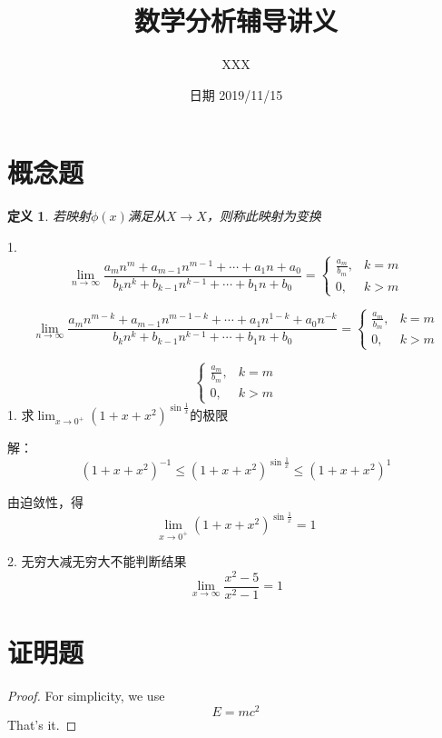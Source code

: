 \documentclass[12pt, a4paper]{ctexart}
\title{数学分析辅导讲义}
\date{日期 2019/11/15}
\author{XXX}
\newtheorem{define}{定义} %
\begin{document}
\maketitle{}

\section{概念题}

    \begin{define}
    若映射$\phi(x)$满足从$X \to X$，则称此映射为变换
    \end{define}


    \begin{flushleft} %
    1.\[
    \lim _{n \rightarrow \infty} \frac{a_{m} n^{m}+a_{m-1} n^{m-1}+\cdots+a_{1} n+a_{0}}{b_{k} n^{k}+b_{k-1} n^{k-1}+\cdots+b_{1} n+b_{0}}=\left\{\begin{array}{ll}{\frac{a_{m}}{b_{m}},} & {k=m} \\ {0,} & {k>m}\end{array}\right.
    \] %

    \[\lim _{n \rightarrow \infty} \frac{a_{m}n^{m-k}+a_{m-1}n^{m-1-k}+\cdots+a_1n^{1-k}+a_0n^{-k}}{b_kn^k+b_{k-1}n^{k-1}+\cdots+b_1n^{}+b_0}=\left\{\begin{array}{ll}
        {\frac{a_m}{b_{m}}},&{k = m} \\ {0,}& {k>m}
    \end{array}\right.
    \]

    \[
\left\{\begin{array}{ll}{\frac{a_{m}}{b_{m}},} & {k=m} \\ {0,} & {k>m}\end{array}\right.
\]
    1. 求$
    \lim _{x \rightarrow 0^{+}}\left(1+x+x^{2}\right)^{\sin \frac{1}{x}}
    $的极限

    解：
    \[
    \left(1+x+x^{2}\right)^{-1} \leqslant\left(1+x+x^{2}\right)^{\sin \frac{1}{x}} \leqslant\left(1+x+x^{2}\right)^{1}
    \]

    由迫敛性，得$$\lim _{x \rightarrow 0^{+}} (1+x+x^2)^{\sin \frac{1}{x}} = 1$$


    2. 无穷大减无穷大不能判断结果
    \[
    \lim _{x \rightarrow \infty} \frac{x^{2}-5}{x^{2}-1}=1
    \]
    \end{flushleft}

\section{证明题}
    \begin{proof} %
    For simplicity, we use
    \[
    E=mc^2
    \]
    That's it.
    \end{proof}
\end{document}
